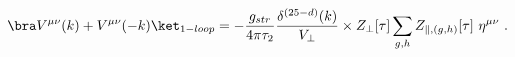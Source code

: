 \begin{equation}
  \bra V^{\mu \nu}(k)+  V^{\mu \nu}(-k) \ket_{1-loop} =
 -\frac{g_{str}}{4\pi\tau_2} \frac{\delta^{(25-d)}(k)}{V_\perp}\times
 Z_\perp[\tau]\sum_{g,h} Z_{\parallel,(g,h)}[\tau ]~\eta^{\mu\nu} \ .
\end{equation}

